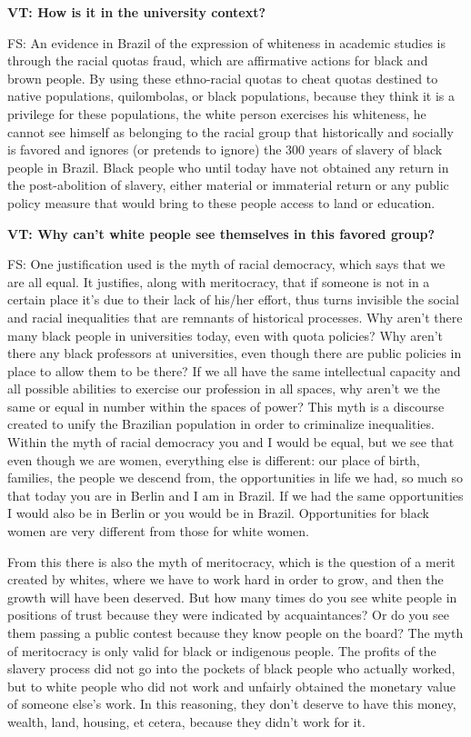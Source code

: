 \documentclass[a4paper,
fontsize=11pt,
oneside,
numbers=noperiodatend,
parskip=half-,
bibliography=totoc,
final
]{scrartcl}
\begin{document}
\pagebreak

\textbf{VT: How is it in the university context?}

FS: An evidence in Brazil of the expression of whiteness in academic
studies is through the racial quotas fraud, which are affirmative
actions for black and brown people. By using these ethno-racial quotas
to cheat quotas destined to native populations, quilombolas, or black
populations, because they think it is a privilege for these populations,
the white person exercises his whiteness, he cannot see himself as
belonging to the racial group that historically and socially is favored
and ignores (or pretends to ignore) the 300 years of slavery of black
people in Brazil. Black people who until today have not obtained any
return in the post-abolition of slavery, either material or immaterial
return or any public policy measure that would bring to these people
access to land or education.

\textbf{VT: Why can't white people see themselves in this favored
group?}

FS: One justification used is the myth of racial democracy, which says
that we are all equal. It justifies, along with meritocracy, that if
someone is not in a certain place it's due to their lack of his/her
effort, thus turns invisible the social and racial inequalities that are
remnants of historical processes. Why aren't there many black people in
universities today, even with quota policies? Why aren't there any black
professors at universities, even though there are public policies in
place to allow them to be there? If we all have the same intellectual
capacity and all possible abilities to exercise our profession in all
spaces, why aren't we the same or equal in number within the spaces of
power? This myth is a discourse created to unify the Brazilian
population in order to criminalize inequalities. Within the myth of
racial democracy you and I would be equal, but we see that even though
we are women, everything else is different: our place of birth,
families, the people we descend from, the opportunities in life we had,
so much so that today you are in Berlin and I am in Brazil. If we had
the same opportunities I would also be in Berlin or you would be in
Brazil. Opportunities for black women are very different from those for
white women.

From this there is also the myth of meritocracy, which is the question
of a merit created by whites, where we have to work hard in order to
grow, and then the growth will have been deserved. But how many times do
you see white people in positions of trust because they were indicated
by acquaintances? Or do you see them passing a public contest because
they know people on the board? The myth of meritocracy is only valid for
black or indigenous people. The profits of the slavery process did not
go into the pockets of black people who actually worked, but to white
people who did not work and unfairly obtained the monetary value of
someone else's work. In this reasoning, they don't deserve to have this
money, wealth, land, housing, et cetera, because they didn't work for
it.
\end{document}
